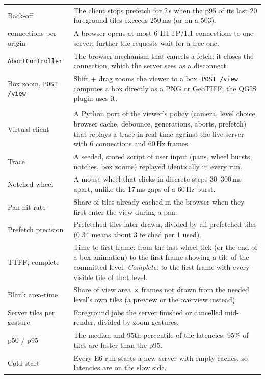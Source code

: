 ﻿\documentclass[11pt,a4paper]{article}
\newcommand{\code}[1]{\texttt{#1}}
\begin{document}
\begin{longtable}{>{\raggedright\arraybackslash}p{3.4cm}>{\raggedright\arraybackslash}p{12.0cm}}
Back-off & The client stops prefetch for 2\,s when the p95 of its last 20 foreground tiles exceeds 250\,ms (or on a
503). \\
6 connections per origin & A browser opens at most 6 HTTP/1.1 connections to one server; further tile requests wait
for a free one. \\
\code{AbortController} & The browser mechanism that cancels a fetch; it closes the connection, which the server
sees as a disconnect. \\
Box zoom, \code{POST /view} & Shift + drag zooms the viewer to a box. \code{POST /view} computes a box directly as a PNG
or GeoTIFF; the QGIS plugin uses it. \\
\midrule
\multicolumn{2}{l}{\textit{Phase 5: measuring the viewer (E6)}} \\
Virtual client & A Python port of the viewer's policy (camera, level choice, browser cache, debounce, generations,
aborts, prefetch) that replays a trace in real time against the live server with 6 connections and 60\,Hz frames. \\
Trace & A seeded, stored script of user input (pans, wheel bursts, notches, box zooms) replayed identically in every
run. \\
Notched wheel & A mouse wheel that clicks in discrete steps 30--300\,ms apart, unlike the 17\,ms gaps of a 60\,Hz
burst. \\
Pan hit rate & Share of tiles already cached in the browser when they first enter the view during a pan. \\
Prefetch precision & Prefetched tiles later drawn, divided by all prefetched tiles (0.34 means about 3 fetched per 1
used). \\
TTFF, complete & Time to first frame: from the last wheel tick (or the end of a box animation) to the first frame
showing a tile of the committed level. \emph{Complete}: to the first frame with every visible tile of that level. \\
Blank area-time & Share of view area $\times$ frames not drawn from the needed level's own tiles (a preview or the
overview instead). \\
Server tiles per gesture & Foreground jobs the server finished or cancelled mid-render, divided by zoom gestures. \\
p50 / p95 & The median and 95th percentile of tile latencies: 95\% of tiles are faster than the p95. \\
Cold start & Every E6 run starts a new server with empty caches, so latencies are on the slow side. \\

\end{longtable}
\end{document}

